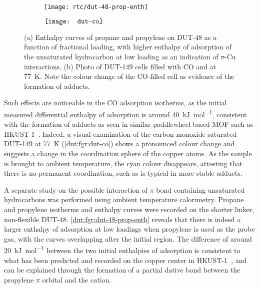 \begin{figure}[htb]
    \centering
    \begin{subfigure}[c]{0.5\linewidth}
        \texttt{[image: rtc/dut-48-prop-enth]}%
        \caption{}\label{dut:fgr:dut-48-prop-enth}
    \end{subfigure}%
    \begin{subfigure}[h]{0.5\linewidth}
        \centering
        \(\vcenter{\hbox{{\texttt{[image: dut-co]}}}}\)%
        \caption{}\label{dut:fgr:dut-co}
    \end{subfigure}%
    \caption{(a) Enthalpy curves of propane and propylene on DUT-48 as 
    a function of fractional loading, with higher enthalpy of 
    adsorption of the unsaturated hydrocarbon at low loading as an 
    indication of \(\pi\)-Cu interactions. (b) Photo of DUT-149 cells
    filled with CO and  at \SI{77}{\kelvin}. Note the 
    colour change of the CO-filled cell as evidence of the formation of 
     adducts.}%
    \label{dut:fgr:dut-48-prop}
\end{figure}

Such effects are noticeable in the CO adsorption isotherms, 
as the initial measured differential enthalpy of adsorption is around 
\SI{40}{\kilo\joule\per\mol}, consistent with the formation of 
 adducts as seen in similar paddlewheel based 
MOF such as HKUST-1~\cite{prestipinoLocalStructureFramework2006}. 
Indeed, a visual examination of the carbon monoxide saturated 
DUT-149 at \SI{77}{\kelvin} 
(\autoref{dut:fgr:dut-co}) shows a pronounced colour change and 
suggests a change in the coordination sphere of the copper 
atoms. As the sample is brought to ambient temperature, the 
cyan colour disappears, attesting that there is no permanent 
coordination, such as is typical in more stable 
adducts.

A separate study on the possible interaction of 
\(\pi\) bond containing unsaturated hydrocarbons was performed
using ambient temperature calorimetry. Propane and propylene 
isotherms and enthalpy curves were recorded on the shorter 
linker, non-flexible DUT-48. \autoref{dut:fgr:dut-48-prop-enth}
reveals that there is indeed a larger enthalpy of adsorption
at low loadings when propylene is used as the probe gas, with 
the curves overlapping after the initial region. The difference 
of around \SI{20}{\kilo\joule\per\mol} between the two initial
enthalpies of adsorption is consistent to what has been predicted
and recorded on the copper center in 
HKUST-1~\cite{rubesAdsorptionPropanePropylene2013}, and can
be explained through the formation of a partial dative bond
between the propylene \(\pi\) orbital and the 
cation. 

